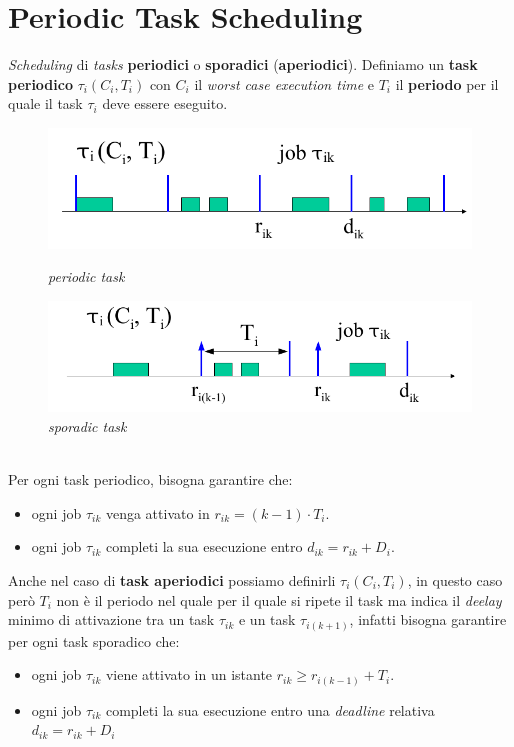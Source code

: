 \chapter{Periodic Task Scheduling}
\textit{Scheduling} di \textit{tasks} \textbf{periodici} o \textbf{sporadici} (\textbf{aperiodici}). Definiamo un \textbf{task periodico} $\tau_i(C_i, T_i)$ con $C_i$ il \textit{worst case execution time} e $T_i$ il \textbf{periodo} per il quale il task $\tau_i$ deve essere eseguito.
\begin{figure}[h]
    \centering
    \begin{minipage}[t]{0.45\textwidth}
        \centering
        \includegraphics[width=\textwidth]{img/T_aT}
        \caption{\textit{periodic task}}
    \end{minipage}
    \begin{minipage}[t]{0.45\textwidth}
        \centering
        \includegraphics[width=\textwidth]{img/T_aT_1}
        \caption{\textit{sporadic task}}
    \end{minipage}
\end{figure}
\\
Per ogni task periodico, bisogna garantire che:
\begin{itemize}
    \item ogni job $\tau_{ik}$ venga attivato in $r_{ik} = (k - 1) \cdot T_i$.
    \item ogni job $\tau_{ik}$ completi la sua esecuzione entro $d_{ik} = r_{ik} + D_i$.
\end{itemize}
Anche nel caso di \textbf{task aperiodici} possiamo definirli $\tau_i(C_i,T_i)$, in questo caso però $T_i$ non è il periodo nel quale per il quale si ripete il task ma indica il \textit{deelay} minimo di attivazione tra un task $\tau_{ik}$ e un task $\tau_{i(k+1)}$, infatti bisogna garantire per ogni task sporadico che:
\begin{itemize}
    \item ogni job $\tau_{ik}$ viene attivato in un istante $r_{ik} \geq r_{i(k-1)} + T_i$.
    \item ogni job $\tau_{ik}$ completi la sua esecuzione entro una \textit{deadline} relativa $d_{ik} = r_{ik} + D_i$
\end{itemize}

